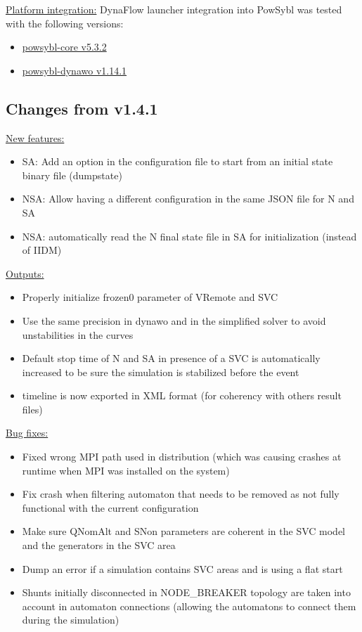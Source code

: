 \documentclass[a4paper, 12pt]{report}
\begin{document}
\underline{Platform integration:}
DynaFlow launcher integration into PowSybl was tested with the following versions:
\begin{itemize}
\item \href{https://github.com/powsybl/powsybl-core/releases/tag/v5.3.2}{powsybl-core v5.3.2}
\item \href{https://github.com/powsybl/powsybl-dynawo/releases/tag/v1.14.1}{powsybl-dynawo v1.14.1}
\end{itemize}

\subsection{Changes from v1.4.1}

\underline{New features:}

\begin{itemize}
\item SA: Add an option in the configuration file to start from an initial state binary file (dumpstate)
\item NSA: Allow having a different configuration in the same JSON file for N and SA
\item NSA: automatically read the N final state file in SA for initialization (instead of IIDM)
\end{itemize}

\underline{Outputs:}

\begin{itemize}
\item Properly initialize frozen0 parameter of VRemote and SVC
\item Use the same precision in dynawo and in the simplified solver to avoid unstabilities in the curves
\item Default stop time of N and SA in presence of a SVC is automatically increased to be sure the simulation is stabilized before the event
\item timeline is now exported in XML format (for coherency with others result files)
\end{itemize}

\underline{Bug fixes:}

\begin{itemize}
\item Fixed wrong MPI path used in distribution (which was causing crashes at runtime when MPI was installed on the system)
\item Fix crash when filtering automaton that needs to be removed as not fully functional with the current configuration
\item Make sure QNomAlt and SNon parameters are coherent in the SVC model and the generators in the SVC area
\item Dump an error if a simulation contains SVC areas and is using a flat start
\item Shunts initially disconnected in NODE\_BREAKER topology are taken into account in automaton connections (allowing the automatons to connect them during the simulation)
\end{itemize}
\end{document}
